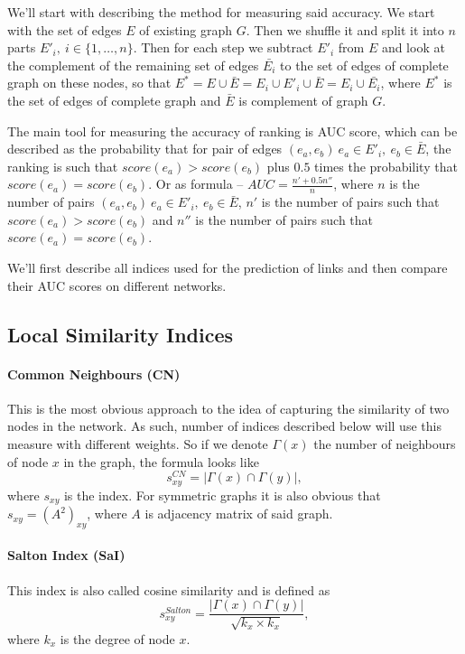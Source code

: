 \documentclass{llncs}
\begin{document}
We'll start with describing the method for measuring said accuracy. We start with the set of edges $E$ of existing graph $G$. Then we shuffle it and split it into $n$ parts $E'_i, \ i \in \{1, \ldots, n\}$. Then for each step we subtract $E'_i$ from $E$ and look at the complement of the remaining set of edges $\bar{E_i}$ to the set of edges of complete graph on these nodes, so that $E^* = E \cup \bar{E} = E_i \cup E'_i \cup \bar{E} = E_i \cup \bar{E_i}$, where $E^*$ is the set of edges of complete graph and $\bar{E}$ is complement of graph $G$.

The main tool for measuring the accuracy of ranking is AUC \cite{auc} score, which can be described as the probability that for pair of edges $(e_a, e_b) \ e_a \in E'_i, \ e_b \in \bar{E}$, the ranking is such that $score(e_a) > score(e_b)$ plus $0.5$ times the probability that $score(e_a) = score(e_b)$. Or as formula -- $AUC = \frac{n' + 0.5 n''}{n}$, where $n$ is the number of pairs $(e_a, e_b) \ e_a \in E'_i, \ e_b \in \bar{E}$, $n'$ is the number of pairs such that $score(e_a) > score(e_b)$ and $n''$ is the number of pairs such that $score(e_a) = score(e_b)$.

We'll first describe all indices used for the prediction of links and then compare their AUC scores on different networks.
%
\subsection{Local Similarity Indices}
%
\paragraph{Common Neighbours (CN)}
%
This is the most obvious approach to the idea of capturing the similarity of two nodes in the network. As such, number of indices described below will use this measure with different weights. So if we denote $\Gamma(x)$ the number of neighbours of node $x$ in the graph, the formula looks like
\begin{equation}
s_{xy}^{CN} = |\Gamma(x) \cap \Gamma(y)|,
\end{equation}
where $s_{xy}$ is the index. For symmetric graphs it is also obvious that $s_{xy} = (A^2)_{xy}$, where $A$ is adjacency matrix of said graph.
%
\paragraph{Salton Index (SaI) \cite{salton-index}}
%
This index is also called cosine similarity and is defined as
\begin{equation}
s_{xy}^{Salton} = \frac{|\Gamma(x) \cap \Gamma(y)|}{\sqrt{k_x \times k_x}},
\end{equation}
where $k_x$ is the degree of node $x$.
%
\end{document}
